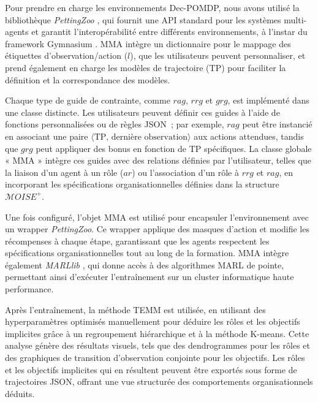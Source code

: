 Pour prendre en charge les environnements Dec-POMDP, nous avons utilisé la bibliothèque \textit{PettingZoo} \cite{terry2020pettingzoo}, qui fournit une API standard pour les systèmes multi-agents et garantit l'interopérabilité entre différents environnements, à l'instar du framework Gymnasium \cite{kwiatkowski2024}. MMA intègre un dictionnaire pour le mappage des étiquettes d'observation/action ($l$), que les utilisateurs peuvent personnaliser, et prend également en charge les modèles de trajectoire (TP) pour faciliter la définition et la correspondance des modèles.

Chaque type de guide de contrainte, comme $rag$, $rrg$ et $grg$, est implémenté dans une classe distincte. Les utilisateurs peuvent définir ces guides à l'aide de fonctions personnalisées ou de règles JSON~; par exemple, $rag$ peut être instancié en associant une paire $\langle \text{TP, dernière observation} \rangle$ aux actions attendues, tandis que $grg$ peut appliquer des bonus en fonction de TP spécifiques. La classe globale « MMA » intègre ces guides avec des relations définies par l'utilisateur, telles que la liaison d'un agent à un rôle ($ar$) ou l'association d'un rôle à $rrg$ et $rag$, en incorporant les spécifications organisationnelles définies dans la structure $\mathcal{M}OISE^+$.

Une fois configuré, l'objet MMA est utilisé pour encapsuler l'environnement avec un wrapper \textit{PettingZoo}. Ce wrapper applique des masques d'action et modifie les récompenses à chaque étape, garantissant que les agents respectent les spécifications organisationnelles tout au long de la formation. MMA intègre également \textit{MARLlib} \cite{hu2021marlib}, qui donne accès à des algorithmes MARL de pointe, permettant ainsi d'exécuter l'entraînement sur un cluster informatique haute performance.

Après l'entraînement, la méthode TEMM est utilisée, en utilisant des hyperparamètres optimisés manuellement pour déduire les rôles et les objectifs implicites grâce à un regroupement hiérarchique et à la méthode K-means. Cette analyse génère des résultats visuels, tels que des dendrogrammes pour les rôles et des graphiques de transition d'observation conjointe pour les objectifs. Les rôles et les objectifs implicites qui en résultent peuvent être exportés sous forme de trajectoires JSON, offrant une vue structurée des comportements organisationnels déduits.




\clearpage
\thispagestyle{empty}
\null
\newpage

